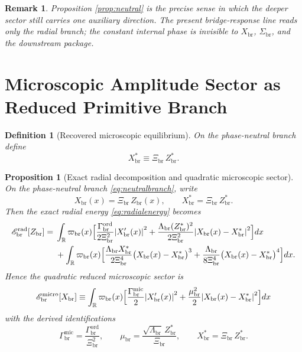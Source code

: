 \documentclass[11pt]{article}
\newcommand{\ProfWeight}{\varpi_{\mathrm{br}}}
\newcommand{\RespSus}{\Sigma_{\mathrm{br}}}
\newcommand{\RespMicro}{X_{\mathrm{br}}}
\newcommand{\RespMicroEq}{X_{\mathrm{br}}^{\ast}}
\newcommand{\RespMicroFluxCoeff}{\Gamma_{\mathrm{br}}^{\mathrm{mic}}}
\newcommand{\RespMicroGap}{\mu_{\mathrm{br}}}
\newcommand{\RespMicroEnergy}{\mathscr E_{\mathrm{br}}^{\mathrm{micro}}}
\newcommand{\RespOrderAmp}{Z_{\mathrm{br}}}
\newcommand{\RespOrderEq}{Z_{\mathrm{br}}^{\ast}}
\newcommand{\RespOrderReadout}{\Xi_{\mathrm{br}}}
\newcommand{\RespOrderStiff}{\Gamma_{\mathrm{br}}^{\mathrm{ord}}}
\newcommand{\RespOrderQuartic}{\Lambda_{\mathrm{br}}}
\newcommand{\RespOrderRadEnergy}{\mathscr E_{\mathrm{br}}^{\mathrm{rad}}}
\newtheorem{definition}{Definition}
\newtheorem{proposition}{Proposition}
\newtheorem{remark}{Remark}
\begin{document}
\begin{remark}
Proposition \ref{prop:neutral} is the precise sense in which the deeper sector still carries one auxiliary direction. The present bridge-response line reads only the radial branch; the constant internal phase is invisible to \(\RespMicro\), \(\RespSus\), and the downstream package.
\end{remark}

\section{Microscopic Amplitude Sector as Reduced Primitive Branch}

\begin{definition}[Recovered microscopic equilibrium]
\label{def:microeq}
On the phase-neutral branch define
\begin{equation}
\RespMicroEq\equiv \RespOrderReadout\,\RespOrderEq.
\label{eq:microeqdef}
\end{equation}
\end{definition}

\begin{proposition}[Exact radial decomposition and quadratic microscopic sector]
\label{prop:microdecomp}
On the phase-neutral branch \eqref{eq:neutralbranch}, write
\begin{equation}
\RespMicro(x)=\RespOrderReadout\,\RespOrderAmp(x),
\qquad
\RespMicroEq=\RespOrderReadout\,\RespOrderEq.
\label{eq:branchreadout}
\end{equation}
Then the exact radial energy \eqref{eq:radialenergy} becomes
\begin{align}
\RespOrderRadEnergy[\RespOrderAmp]
=\;&
\int_{\mathbb R}\ProfWeight(x)\Bigl[
\frac{\RespOrderStiff}{2\RespOrderReadout^2}\abs{\RespMicro'(x)}^2
+
\frac{\RespOrderQuartic(\RespOrderEq)^2}{2\RespOrderReadout^2}\abs{\RespMicro(x)-\RespMicroEq}^2
\Bigr]dx
\nonumber\\
&+
\int_{\mathbb R}\ProfWeight(x)\Bigl[
\frac{\RespOrderQuartic\RespMicroEq}{2\RespOrderReadout^4}\bigl(\RespMicro(x)-\RespMicroEq\bigr)^3
+
\frac{\RespOrderQuartic}{8\RespOrderReadout^4}\bigl(\RespMicro(x)-\RespMicroEq\bigr)^4
\Bigr]dx.
\label{eq:exactradialdecomp}
\end{align}
Hence the quadratic reduced microscopic sector is
\begin{equation}
\RespMicroEnergy[\RespMicro]
\equiv
\int_{\mathbb R}\ProfWeight(x)\Bigl[
\frac{\RespMicroFluxCoeff}{2}\abs{\RespMicro'(x)}^2
+
\frac{\RespMicroGap^2}{2}\abs{\RespMicro(x)-\RespMicroEq}^2
\Bigr]dx
\label{eq:recoveredmicroenergy}
\end{equation}
with the derived identifications
\begin{equation}
\RespMicroFluxCoeff=\frac{\RespOrderStiff}{\RespOrderReadout^2},
\qquad
\RespMicroGap=\frac{\sqrt{\RespOrderQuartic}\,\RespOrderEq}{\RespOrderReadout},
\qquad
\RespMicroEq=\RespOrderReadout\,\RespOrderEq.
\label{eq:microidentification}
\end{equation}
\end{proposition}
\end{document}
